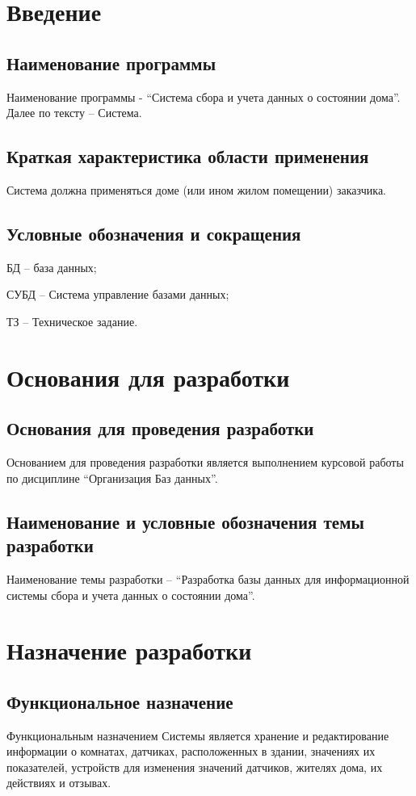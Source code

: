 \section{Введение}
  \subsection{Наименование программы}
    Наименование программы - “Система сбора и учета данных о состоянии дома”. Далее по тексту – Система.
  \subsection{Краткая характеристика области применения}
    Система должна применяться доме (или ином жилом помещении) заказчика.  
  \subsection{Условные обозначения и сокращения}
    БД – база данных;
    
    СУБД – Система управление базами данных;
    
    ТЗ – Техническое задание.
  \section{Основания для разработки}  
  \subsection{Основания для проведения разработки}
    Основанием для проведения разработки является выполнением курсовой работы по дисциплине “Организация Баз данных”.
  \subsection{Наименование и условные обозначения темы разработки}
    Наименование темы разработки – “Разработка базы данных для информационной системы сбора и учета данных о состоянии дома”.
\section{Назначение разработки}
  \subsection{Функциональное назначение}
    Функциональным назначением Системы является хранение и редактирование информации о комнатах, датчиках, расположенных в здании, значениях их показателей,  устройств для изменения значений датчиков, жителях дома, их действиях и отзывах.

